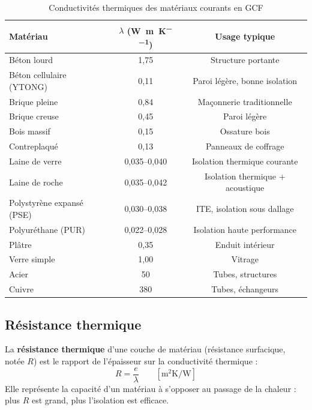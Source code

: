 \begin{table}[H]
  \centering
  \caption{Conductivités thermiques des matériaux courants en GCF}
  \begin{tabular}{lcc}
    \toprule
    Matériau & \(\lambda\) (\si{\watt\per\meter\per\kelvin}) & Usage typique \\
    \midrule
    Béton lourd & 1,75 & Structure portante \\
    Béton cellulaire (YTONG) & 0,11 & Paroi légère, bonne isolation \\
    Brique pleine & 0,84 & Maçonnerie traditionnelle \\
    Brique creuse & 0,45 & Paroi légère \\
    Bois massif & 0,15 & Ossature bois \\
    Contreplaqué & 0,13 & Panneaux de coffrage \\
    Laine de verre & 0,035–0,040 & Isolation thermique courante \\
    Laine de roche & 0,035–0,042 & Isolation thermique + acoustique \\
    Polystyrène expansé (PSE) & 0,030–0,038 & ITE, isolation sous dallage \\
    Polyuréthane (PUR) & 0,022–0,028 & Isolation haute performance \\
    Plâtre & 0,35 & Enduit intérieur \\
    Verre simple & 1,00 & Vitrage \\
    Acier & 50 & Tubes, structures \\
    Cuivre & 380 & Tubes, échangeurs \\
    \bottomrule
  \end{tabular}
\end{table}

\subsection{Résistance thermique}

\begin{definition}
  La \textbf{résistance thermique} d'une couche de matériau (résistance surfacique, notée
  \(R\)) est le rapport de l'épaisseur sur la conductivité thermique :
  \begin{equation}
    R = \frac{e}{\lambda}
    \qquad \left[\si{\meter\squared\kelvin\per\watt}\right]
    \label{eq:resistance_thermique}
  \end{equation}
  Elle représente la capacité d'un matériau à s'opposer au passage de la chaleur : plus
  \(R\) est grand, plus l'isolation est efficace.
\end{definition}

